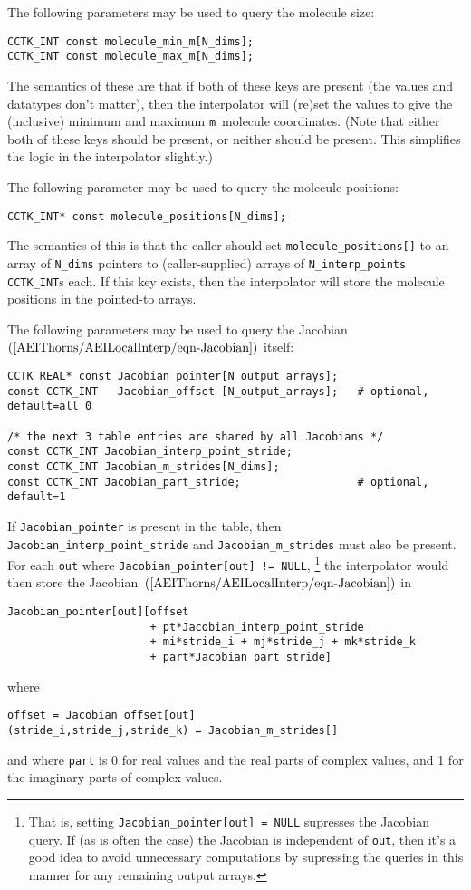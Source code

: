 The following parameters may be used to query the molecule size:
\begin{verbatim}
CCTK_INT const molecule_min_m[N_dims];
CCTK_INT const molecule_max_m[N_dims];
\end{verbatim}
The semantics of these are that if both of these keys are present
(the values and datatypes don't matter), then the interpolator will
(re)set the values to give the (inclusive) minimum and maximum
\verb|m|~molecule coordinates.  (Note that either both of these
keys should be present, or neither should be present.  This
simplifies the logic in the interpolator slightly.)

The following parameter may be used to query the molecule positions:
\begin{verbatim}
CCTK_INT* const molecule_positions[N_dims];
\end{verbatim}
The semantics of this is that the caller should set
\verb|molecule_positions[]| to an array of \verb|N_dims| pointers to
(caller-supplied) arrays of \verb|N_interp_points| \verb|CCTK_INT|s
each.  If this key exists, then the interpolator will store the
molecule positions in the pointed-to arrays.

The following parameters may be used to query the
Jacobian~$(\ref{AEIThorns/AEILocalInterp/eqn-Jacobian})$ itself:
\begin{verbatim}
CCTK_REAL* const Jacobian_pointer[N_output_arrays];
const CCTK_INT   Jacobian_offset [N_output_arrays];   # optional, default=all 0

/* the next 3 table entries are shared by all Jacobians */
const CCTK_INT Jacobian_interp_point_stride;
const CCTK_INT Jacobian_m_strides[N_dims];
const CCTK_INT Jacobian_part_stride;                  # optional, default=1
\end{verbatim}
If \verb|Jacobian_pointer| is present in the table, then
\verb|Jacobian_interp_point_stride| and \verb|Jacobian_m_strides|
must also be present.  For each \verb|out| where
\verb|Jacobian_pointer[out] != NULL|,%
\footnote{%
	 That is, setting {\tt Jacobian\_pointer[out] = NULL}
	 supresses the Jacobian query.  If (as is often the
	 case) the Jacobian is independent of {\tt out}, then
	 it's a good idea to avoid unnecessary computations by
	 supressing the queries in this manner for any remaining
	 output arrays.
	 }%
{} the interpolator would then store the
Jacobian~$(\ref{AEIThorns/AEILocalInterp/eqn-Jacobian})$ in
\begin{verbatim}
Jacobian_pointer[out][offset
                      + pt*Jacobian_interp_point_stride
                      + mi*stride_i + mj*stride_j + mk*stride_k
                      + part*Jacobian_part_stride]
\end{verbatim}
where
\begin{verbatim}
offset = Jacobian_offset[out]
(stride_i,stride_j,stride_k) = Jacobian_m_strides[]
\end{verbatim}
and where \verb|part| is 0 for real values and the real parts of complex
values, and 1 for the imaginary parts of complex values.

